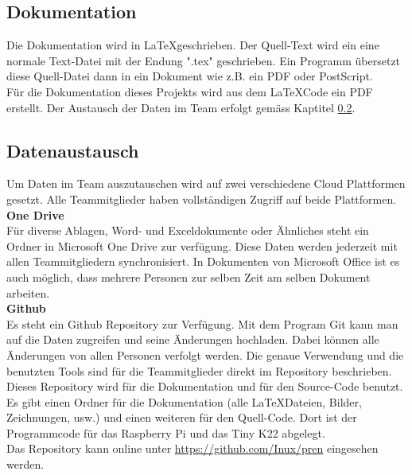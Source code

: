 \documentclass[../../main.tex]{subfiles}
\begin{document}
\subsection{Dokumentation}
Die Dokumentation wird in \LaTeX geschrieben. Der Quell-Text wird ein eine normale Text-Datei mit der Endung ".tex" geschrieben. Ein Programm übersetzt diese Quell-Datei dann in ein Dokument wie z.B. ein PDF oder PostScript. \cite{whatislatex}\\
Für die Dokumentation dieses Projekts wird aus dem \LaTeX Code ein PDF erstellt. Der Austausch der Daten im Team erfolgt gemäss Kaptitel \ref{proj_datenaustausch}.

\subsection{Datenaustausch} \label{proj_datenaustausch}
Um Daten im Team auszutauschen wird auf zwei verschiedene Cloud Plattformen gesetzt. Alle Teammitglieder haben vollständigen Zugriff auf beide Plattformen.\\

\textbf{One Drive}\\
Für diverse Ablagen, Word- und Exceldokumente oder Ähnliches steht ein Ordner in Microsoft One Drive zur verfügung. Diese Daten werden jederzeit mit allen Teammitgliedern synchronisiert. In Dokumenten von Microsoft Office ist es auch möglich, dass mehrere Personen zur selben Zeit am selben Dokument arbeiten.\\

\textbf{Github}\\
Es steht ein Github Repository zur Verfügung. Mit dem Program Git kann man auf die Daten zugreifen und seine Änderungen hochladen. Dabei können alle Änderungen von allen Personen verfolgt werden. Die genaue Verwendung und die benutzten Tools sind für die Teammitglieder direkt im Repository beschrieben.\\
Dieses Repository wird für die Dokumentation und für den Source-Code benutzt. Es gibt einen Ordner für die Dokumentation (alle \LaTeX Dateien, Bilder, Zeichnungen, usw.) und einen weiteren für den Quell-Code. Dort ist der Programmcode für das Raspberry Pi und das Tiny K22 abgelegt.\\
Das Repository kann online unter \url{https://github.com/Inux/pren} eingesehen werden.
\end{document}
